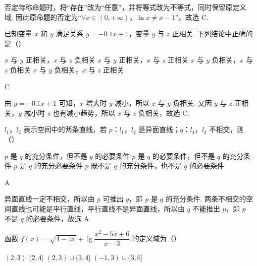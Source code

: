 \begin{solution}
否定特称命题时，将“存在”改为“任意”，并将等式改为不等式，同时保留原定义域. 因此原命题的否定为“\(\forall x\in(0,+\infty)\)，\(\ln x\neq x-1\)”，故选 C.
\end{solution}

\begin{problem}
已知变量 \(x\) 和 \(y\) 满足关系 \(y=-0.1x+1\)，变量 \(y\) 与 \(z\) 正相关. 下列结论中正确的是（\quad）

\choices
    {\(x\) 与 \(y\) 正相关，\(x\) 与 \(z\) 负相关}
    {\(x\) 与 \(y\) 正相关，\(x\) 与 \(z\) 正相关}
    {\(x\) 与 \(y\) 负相关，\(x\) 与 \(z\) 负相关}
    {\(x\) 与 \(y\) 负相关，\(x\) 与 \(z\) 正相关}
\end{problem}

\begin{answer}
C
\end{answer}

\begin{solution}
由 \(y=-0.1x+1\) 可知，\(x\) 增大时 \(y\) 减小，所以 \(x\) 与 \(y\) 负相关. 又因 \(y\) 与 \(z\) 正相关，\(y\) 减小时 \(z\) 也有减小趋势，所以 \(x\) 与 \(z\) 负相关，故选 C.
\end{solution}

\begin{problem}
\(l_1\)，\(l_2\) 表示空间中的两条直线，若 \(p\)：\(l_1\)，\(l_2\) 是异面直线；\(q\)：\(l_1\)，\(l_2\) 不相交，则（\quad）

\choices
    {\(p\) 是 \(q\) 的充分条件，但不是 \(q\) 的必要条件}
    {\(p\) 是 \(q\) 的必要条件，但不是 \(q\) 的充分条件}
    {\(p\) 是 \(q\) 的充分必要条件}
    {\(p\) 既不是 \(q\) 的充分条件，也不是 \(q\) 的必要条件}
\end{problem}

\begin{answer}
A
\end{answer}

\begin{solution}
异面直线一定不相交，所以由 \(p\) 可推出 \(q\)，即 \(p\) 是 \(q\) 的充分条件. 两条不相交的空间直线也可能是平行直线，平行直线不是异面直线，所以由 \(q\) 不能推出 \(p\)，即 \(p\) 不是 \(q\) 的必要条件，故选 A.
\end{solution}

\begin{problem}
函数 \(f(x)=\sqrt{4-|x|}+\lg\dfrac{x^2-5x+6}{x-3}\) 的定义域为（\quad）

\choices
    {\((2,3)\)}
    {\((2,4]\)}
    {\((2,3)\cup(3,4]\)}
    {\((-1,3)\cup(3,6]\)}
\end{problem}

